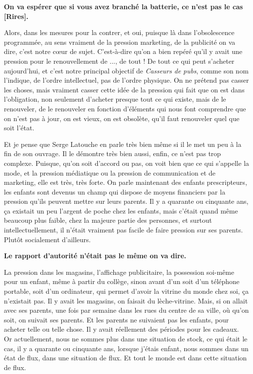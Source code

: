 \begin{small}
\vspace{1\baselineskip}

\textbf{On va espérer que si vous avez branché la batterie, ce n'est pas le cas [Rires].}

\vspace{1\baselineskip}

Alors, dans les mesures pour la contrer, et oui, puisque là dans l'obsolescence programmée, au sens vraiment de la pression marketing, de la publicité on va dire, c'est notre cœur de sujet. C'est-à-dire qu'on a bien repéré qu'il y avait une pression pour le renouvellement de ..., de tout ! De tout ce qui peut s'acheter aujourd'hui, et c'est notre principal objectif de \textit{Casseurs de pubs}, comme son nom l'indique, de l'ordre intellectuel, pas de l'ordre physique. On ne prétend pas casser les choses, mais vraiment casser cette idée de la pression qui fait que on est dans l'obligation, non seulement d'acheter presque tout ce qui existe, mais de le renouveler, de le renouveler en fonction d'éléments qui nous font comprendre que on n’est pas à jour, on est vieux, on est obsolète, qu'il faut renouveler quel que soit l'état.

Et je pense que Serge Latouche en parle très bien même si il le met un peu à la fin de son ouvrage. Il le démontre très bien aussi, enfin, ce n'est pas trop complexe. Puisque, qu'on soit d'accord ou pas, on voit bien que ce qui s'appelle la mode, et la pression médiatique ou la pression de communication et de marketing, elle est très, très forte. On parle maintenant des enfants prescripteurs, les enfants sont devenus un champ qui dispose de moyens financiers par la pression qu'ils peuvent mettre sur leurs parents. Il y a quarante ou cinquante ans, ça existait un peu l'argent de poche chez les enfants, mais c'était quand même beaucoup plus faible, chez la majeure partie des personnes, et surtout intellectuellement, il n'était vraiment pas facile de faire pression sur ses parents. Plutôt socialement d'ailleurs.

\vspace{1\baselineskip}

\textbf{Le rapport d'autorité n'était pas le même on va dire.}

\vspace{1\baselineskip}

La pression dans les magasins, l'affichage publicitaire, la possession soi-même pour un enfant, même à partir du collège, sinon avant d'un soit d'un téléphone portable, soit d'un ordinateur, qui permet d'avoir la vitrine du monde chez soi, ça n'existait pas. Il y avait les magasins, on faisait du lèche-vitrine. Mais, si on allait avec ses parents, une fois par semaine dans les rues du centre de sa ville, où qu'on soit, on suivait ses parents. Et les parents ne suivaient pas les enfants, pour acheter telle ou telle chose. Il y avait réellement des périodes pour les cadeaux. Or actuellement, nous ne sommes plus dans une situation de stock, ce qui était le cas, il y a quarante ou cinquante ans, lorsque j'étais enfant, nous sommes dans un état de flux, dans une situation de flux. Et tout le monde est dans cette situation de flux. 


\end{small}

